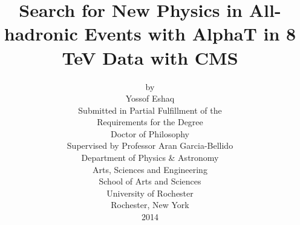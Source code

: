 \documentclass[12pt,twoside,notitlepage]{article}
\newcommand{\clearemptydoublepage}{\newpage{\pagestyle{empty}\cleardoublepage}}
\begin{document}
\thispagestyle{plain}
\begin{titlepage}

  \title{{\boldmath Search for New Physics in All-hadronic Events with AlphaT in 8 TeV Data with CMS}}

  \author{
    by\\[0.3cm]
    Yossof Eshaq\\[0.8cm]
    {Submitted in Partial Fulfillment of the }\\[0.3cm]
    {Requirements for the Degree}\\[0.3cm]
    {Doctor of Philosophy}\\[0.8cm]
    Supervised by Professor Aran Garcia-Bellido\\[0.8cm]
    Department of Physics \& Astronomy\\[0.3cm]
    Arts, Sciences and Engineering \\[0.3cm]
    School of Arts and Sciences\\[0.8cm]
    University of Rochester\\[0.3cm]
    Rochester, New York\\[0.3cm]
    2014
  }
\date{}

\maketitle
\thispagestyle{empty}
\end{titlepage}

\clearemptydoublepage

\pagestyle{fancyplain}
\renewcommand\headrule{}
\lhead{}
\chead{}
\rhead{\thepage}
\lfoot{}
\cfoot{}
\rfoot{}

\doublespacing
\clearemptydoublepage



\clearemptydoublepage



\end{document}
